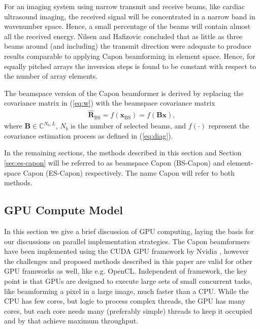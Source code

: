 \documentclass[journal]{IEEEtran}
\newcommand{\mat}[1]{\mathbf{#1}}
\renewcommand{\vec}[1]{\mathbf{#1}}
\begin{document}
For an imaging system using narrow transmit and receive beams, like cardiac ultrasound imaging, the received signal will be concentrated in a narrow band in wavenumber space. Hence, a small percentage of the beams will contain almost all the received energy. Nilsen and Hafizovic concluded that as little as three beams around (and including) the transmit direction were adequate to produce results comparable to applying Capon beamforming in element space. Hence, for equally pitched arrays the inversion steps is found to be constant with respect to the number of array elements.

The beamspace version of the Capon beamformer is derived by replacing the covariance matrix in (\ref{eq:w}) with the beamspace covariance matrix 
\begin{align}
\mat{\hat{R}}_\text{BS} = f(\vec{x}_\text{BS}) = f(\mat{B}\vec{x}), 
\end{align}
where $\mat{B} \in \mathbb{C}^{N_b,L}$, $N_b$ is the number of selected beams, and $f(\cdot)$ represent the covariance estimation process as defined in (\ref{eq:diag}).

In the remaining sections, the methods described in this section and Section \ref{sec:es-capon} will be referred to as beamspace Capon (BS-Capon) and element-space Capon (ES-Capon) respectively. The name Capon will refer to both methods. 

\subsection{GPU Compute Model}



In this section we give a brief discussion of GPU computing, laying the basis for our discussions on parallel implementation strategies. The Capon beamformers have been implemented using the CUDA GPU framework by Nvidia \cite{Nvidia2013}, however the challenges and proposed methods described in this paper are valid for other GPU framworks as well, like e.g. OpenCL. Independent of framework, the key point is that GPUs are designed to execute large sets of small concurrent tasks, like beamforming a pixel in a large image, much faster than a CPU. While the CPU has few cores, but logic to process complex threads, the GPU has many cores, but each core needs many (preferably simple) threads to keep it occupied and by that achieve maximum throughput.
\end{document}
